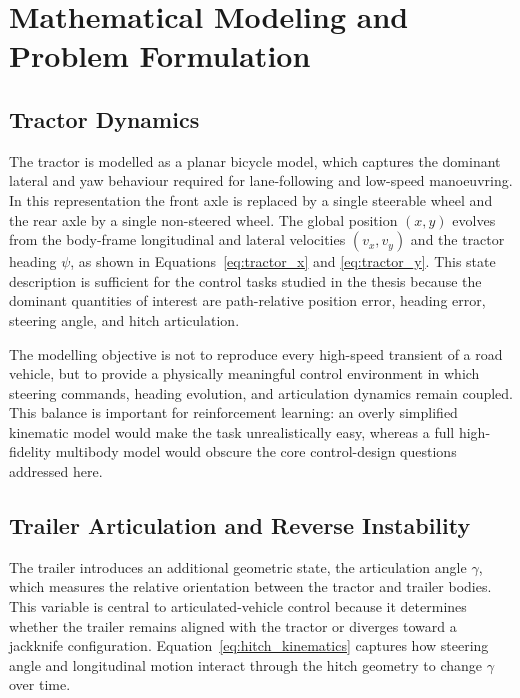 \chapter{Mathematical Modeling and Problem Formulation}
\label{ch:modeling}

\section{Tractor Dynamics}


The tractor is modelled as a planar bicycle model, which captures the dominant lateral and yaw behaviour required for lane-following and low-speed manoeuvring. In this representation the front axle is replaced by a single steerable wheel and the rear axle by a single non-steered wheel. The global position $(x,y)$ evolves from the body-frame longitudinal and lateral velocities $(v_x, v_y)$ and the tractor heading $\psi$, as shown in Equations~\ref{eq:tractor_x} and \ref{eq:tractor_y}. This state description is sufficient for the control tasks studied in the thesis because the dominant quantities of interest are path-relative position error, heading error, steering angle, and hitch articulation.

The modelling objective is not to reproduce every high-speed transient of a road vehicle, but to provide a physically meaningful control environment in which steering commands, heading evolution, and articulation dynamics remain coupled. This balance is important for reinforcement learning: an overly simplified kinematic model would make the task unrealistically easy, whereas a full high-fidelity multibody model would obscure the core control-design questions addressed here.

\section{Trailer Articulation and Reverse Instability}


The trailer introduces an additional geometric state, the articulation angle $\gamma$, which measures the relative orientation between the tractor and trailer bodies. This variable is central to articulated-vehicle control because it determines whether the trailer remains aligned with the tractor or diverges toward a jackknife configuration. Equation~\ref{eq:hitch_kinematics} captures how steering angle and longitudinal motion interact through the hitch geometry to change $\gamma$ over time.

